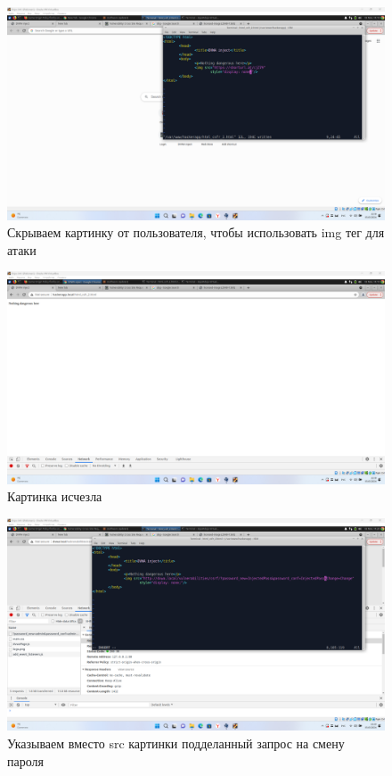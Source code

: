 \documentclass[a4paper]{article}
\begin{document}
  \begin{figure}[H]
    \centering
    \includegraphics[width=\textwidth]{Screenshot_96}
    \caption{Скрываем картинку от пользователя, чтобы использовать img тег для атаки}
  \end{figure}

  \begin{figure}[H]
    \centering
    \includegraphics[width=\textwidth]{Screenshot_97}
    \caption{Картинка исчезла}
  \end{figure}

  \begin{figure}[H]
    \centering
    \includegraphics[width=\textwidth]{Screenshot_98}
    \caption{Указываем вместо src картинки подделанный запрос на смену пароля}
  \end{figure}
\end{document}
